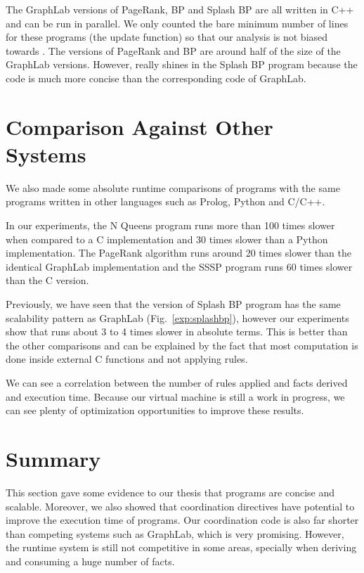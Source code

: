 The GraphLab versions of PageRank, BP and Splash BP are all written in C++ and can be run in
parallel. We only counted the bare minimum number of lines for these programs (the update function)
so that our analysis is not biased towards \lang. The \lang versions of PageRank and BP are around
half of the size of the GraphLab versions. However, \lang really shines in the Splash BP program because
the code is much more concise than the corresponding code of GraphLab.

\section{Comparison Against Other Systems}

We also made some absolute runtime comparisons of \lang programs with the same programs written in
other languages such as Prolog, Python and C/C++.

In our experiments, the N Queens program runs
more than 100 times slower when compared to a C implementation and 30 times slower than a Python
implementation. The PageRank algorithm runs around 20 times slower than the identical GraphLab
implementation and the SSSP program runs 60 times slower than the C version.

Previously, we have seen that the \lang version of Splash BP program has the same scalability pattern
as GraphLab (Fig.~\ref{exp:splashbp}), however our experiments show that \lang runs about 3 to 4 times slower in absolute terms. This is better than the other comparisons and can be explained by the fact
that most computation is done inside external C functions and not applying rules.

We can see a correlation between the number of rules applied and facts derived and execution time.
Because our virtual machine is still a work in progress, we can see plenty of optimization opportunities
to improve these results.

\section{Summary}

This section gave some evidence to our thesis that \lang programs are concise and scalable. Moreover, we
also showed that coordination directives have potential to improve the execution time
of programs. Our coordination code is also far shorter than competing systems such as GraphLab, which is
very promising. However, the \lang runtime system is still not competitive in some areas, specially
when deriving and consuming a huge number of facts.